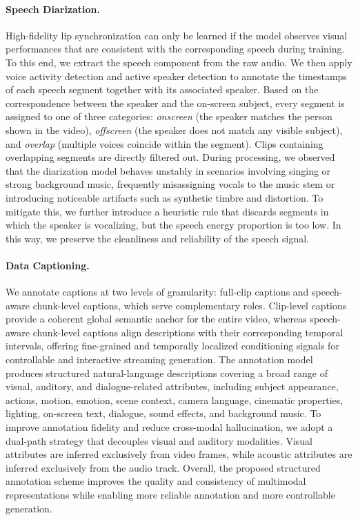 \paragraph{Speech Diarization.} High-fidelity lip synchronization can only be learned if the model observes visual performances that are consistent with the corresponding speech during training. To this end, we extract the speech component from the raw audio. We then apply voice activity detection and active speaker detection to annotate the timestamps of each speech segment together with its associated speaker. Based on the correspondence between the speaker and the on-screen subject, every segment is assigned to one of three categories: \textit{onscreen} (the speaker matches the person shown in the video), \textit{offscreen} (the speaker does not match any visible subject), and \textit{overlap} (multiple voices coincide within the segment). Clips containing overlapping segments are directly filtered out. During processing, we observed that the diarization model behaves unstably in scenarios involving singing or strong background music, frequently misassigning vocals to the music stem or introducing noticeable artifacts such as synthetic timbre and distortion. To mitigate this, we further introduce a heuristic rule that discards segments in which the speaker is vocalizing, but the speech energy proportion is too low. In this way, we preserve the cleanliness and reliability of the speech signal.


\paragraph{Data Captioning.} 
We annotate captions at two levels of granularity: full-clip captions and speech-aware chunk-level captions, which serve complementary roles. Clip-level captions provide a coherent global semantic anchor for the entire video, whereas speech-aware chunk-level captions align descriptions with their corresponding temporal intervals, offering fine-grained and temporally localized conditioning signals for controllable and interactive streaming generation. The annotation model produces structured natural-language descriptions covering a broad range of visual, auditory, and dialogue-related attributes, including subject appearance, actions, motion, emotion, scene context, camera language, cinematic properties, lighting, on-screen text, dialogue, sound effects, and background music. To improve annotation fidelity and reduce cross-modal hallucination, we adopt a dual-path strategy that decouples visual and auditory modalities. Visual attributes are inferred exclusively from video frames, while acoustic attributes are inferred exclusively from the audio track. Overall, the proposed structured annotation scheme improves the quality and consistency of multimodal representations while enabling more reliable annotation and more controllable generation.

